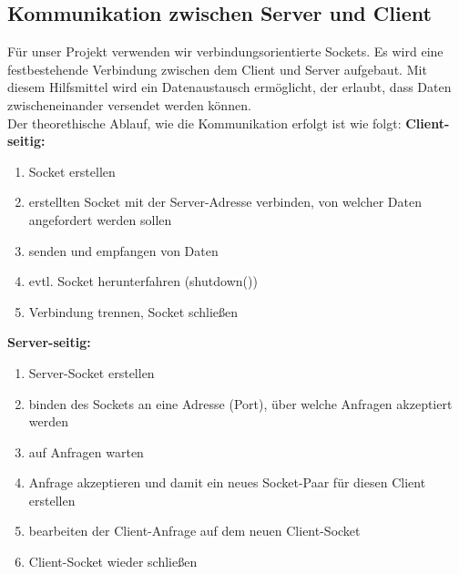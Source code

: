 \documentclass{scrartcl}
\begin{document}
	\subsection{Kommunikation zwischen Server und Client}
		Für unser Projekt verwenden wir verbindungsorientierte Sockets. Es wird eine festbestehende Verbindung zwischen dem Client und Server aufgebaut. Mit diesem Hilfsmittel wird ein Datenaustausch ermöglicht, der erlaubt, dass Daten zwischeneinander versendet werden können.\\
		Der theorethische Ablauf, wie die Kommunikation erfolgt ist wie folgt:
		\newpage
		\textbf{Client-seitig:}
		\begin{enumerate}
			\item Socket erstellen
			\item erstellten Socket mit der Server-Adresse verbinden, von welcher Daten angefordert werden sollen
			\item senden und empfangen von Daten
			\item evtl. Socket herunterfahren (shutdown())
			\item Verbindung trennen, Socket schließen
		\end{enumerate}
		
		\textbf{Server-seitig:}
		\begin{enumerate}
			\item Server-Socket erstellen
			\item binden des Sockets an eine Adresse (Port), über welche Anfragen akzeptiert werden
			\item auf Anfragen warten
			\item Anfrage akzeptieren und damit ein neues Socket-Paar für diesen Client erstellen
			\item bearbeiten der Client-Anfrage auf dem neuen Client-Socket
			\item Client-Socket wieder schließen
		\end{enumerate}
\end{document}
